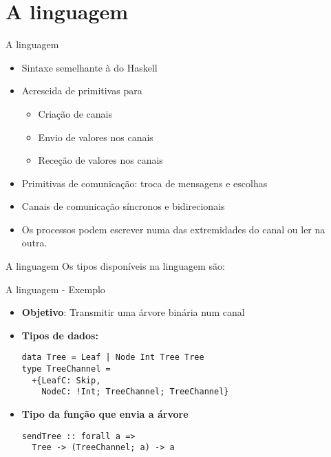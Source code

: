 \section{A linguagem}

\begin{frame}[fragile]{A linguagem}

  \begin{itemize}
  \item Sintaxe semelhante à do Haskell
  \newline
  \item Acrescida de primitivas para
    \begin{itemize}
    \item Criação de canais
    \item Envio de valores nos canais
    \item Receção de valores nos canais
    \end{itemize}
 
  \item Primitivas de comunicação: troca de mensagens e escolhas
  \newline
  \item Canais de comunicação síncronos e bidirecionais
  \newline
  \item Os processos podem escrever numa das extremidades do canal ou ler na outra.
  \end{itemize}  
\end{frame}

\begin{frame}[fragile]{A linguagem}
  Os tipos disponíveis na linguagem são:
    
\end{frame}

\lstset{language=CFST, style=eclipse, frame=none, numbers=none}
\begin{frame}[fragile]{A linguagem - Exemplo}
  \begin{itemize}
  \item \textbf{Objetivo}: Transmitir uma árvore binária num canal
    \newline
  \item \textbf{Tipos de dados:}
\begin{lstlisting}
data Tree = Leaf | Node Int Tree Tree 
type TreeChannel =
  +{LeafC: Skip,
    NodeC: !Int; TreeChannel; TreeChannel}
\end{lstlisting}

  \item \textbf{Tipo da função que envia a árvore}
\begin{lstlisting}
sendTree :: forall a =>
  Tree -> (TreeChannel; a) -> a
\end{lstlisting}
  \end{itemize}
\end{frame}

